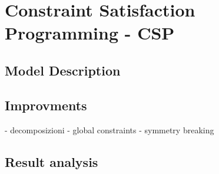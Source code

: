 \section{Constraint Satisfaction Programming - CSP}

\subsection{Model Description}

\subsection{Improvments}
	- decomposizioni
	- global constraints
	- symmetry breaking
\subsection{Result analysis}

\clearpage
